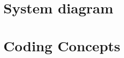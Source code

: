 \section{System diagram}

\begin{landscape}

    
\end{landscape}
\section{Coding Concepts}



\printbibliography\cleardoublepage


